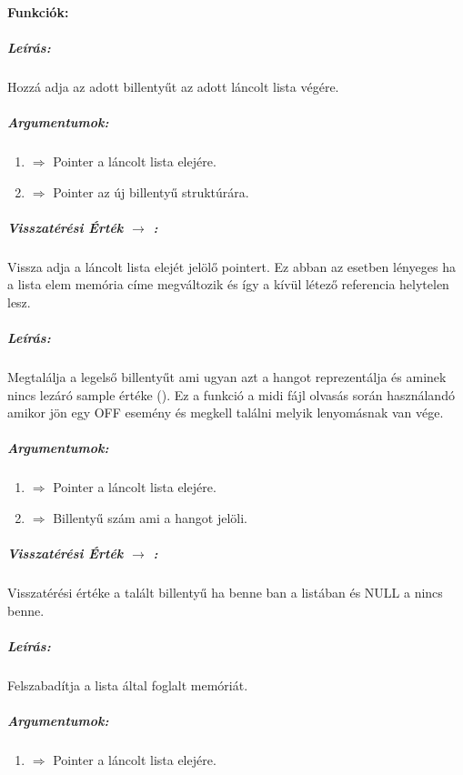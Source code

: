 \documentclass{article}
\begin{document}
\paragraph{Funkciók:}


\subparagraph{Leírás:}
Hozzá adja az adott billentyűt az adott láncolt lista végére.

\subparagraph{Argumentumok:}
\begin{enumerate}
    \item {} \(\Rightarrow\) Pointer a láncolt lista
        elejére.
    \item {} \(\Rightarrow\) Pointer az új billentyű 
        struktúrára.
\end{enumerate}

\subparagraph{Visszatérési Érték \(\rightarrow\) :}
Vissza adja a láncolt lista elejét jelölő  pointert.
Ez abban az esetben lényeges ha a  lista elem memória címe 
megváltozik és így a kívül létező referencia helytelen lesz.
\chline


\subparagraph{Leírás:}
Megtalálja a legelső billentyűt ami ugyan azt a hangot reprezentálja és
aminek nincs lezáró sample értéke ().
Ez a funkció a midi fájl olvasás során használandó amikor jön egy
OFF esemény és megkell találni melyik lenyomásnak van vége.

\subparagraph{Argumentumok:}
\begin{enumerate}
    \item {} \(\Rightarrow\) Pointer a láncolt lista
        elejére.
    \item {} \(\Rightarrow\) Billentyű szám ami a hangot jelöli.
\end{enumerate}

\subparagraph{Visszatérési Érték \(\rightarrow\) :}
Visszatérési értéke a talált billentyű ha benne ban a listában és NULL
a nincs benne.
\chline


\subparagraph{Leírás:}
Felszabadítja a lista által foglalt memóriát.

\subparagraph{Argumentumok:}
\begin{enumerate}
    \item {} \(\Rightarrow\) Pointer a láncolt lista
        elejére.
\end{enumerate}
\end{document}
